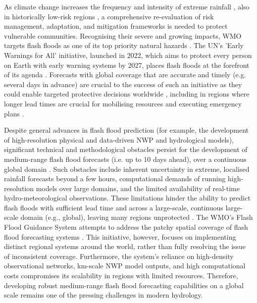 As  climate change increases the frequency and intensity of extreme rainfall \citep{WMO_2025, IPCC_2023}, also in historically low-risk regions \citep{Fowler_2021c}, a comprehensive re-evaluation of risk management, adaptation, and mitigation frameworks is needed to protect vulnerable communities. Recognising their severe and growing impacts, WMO targets flash floods as one of its top priority natural hazards \citep{WMO_2025}. The UN's 'Early Warnings for All' initiative, launched in 2022, which aims to protect every person on Earth with early warning systems by 2027, places flash floods at the forefront of its agenda \citep{UN_2022}. Forecasts with global coverage that are accurate and timely (e.g. several days in advance) are crucial to the success of such an initiative as they could enable targeted protective decisions worldwide \citep{Merz_2020}, including in regions where longer lead times are crucial for mobilising resources and executing emergency plans \citep{Bazo_2019}. 

Despite  general advances in flash flood prediction (for example, the development of high-resolution physical and data-driven NWP and hydrological models), significant technical and methodological obstacles persist for the development of medium-range flash flood forecasts (i.e. up to 10 days ahead), over a continuous global domain \citep{Zanchetta_2020}. Such obstacles include inherent uncertainty in extreme, localised rainfall forecasts beyond a few hours, computational demands of running high-resolution models over large domains, and the limited availability of real-time hydro-meteorological observations. These limitations hinder the ability to predict flash floods with sufficient lead time and across a large-scale, continuous large-scale domain (e.g., global), leaving many regions unprotected \citep{AlRawas_2024}. The WMO's Flash Flood Guidance System attempts to address the patchy spatial coverage of flash flood forecasting systems \citep{Georgakakos_2022}. This initiative, however, focuses on implementing distinct regional systems around the world, rather than fully resolving the issue of inconsistent coverage. Furthermore, the system's reliance on high-density observational networks, km-scale NWP model outputs, and high computational costs compromises its scalability in regions with limited resources. Therefore, developing robust medium-range flash flood forecasting capabilities on a global scale remains one of the pressing challenges in modern hydrology.

